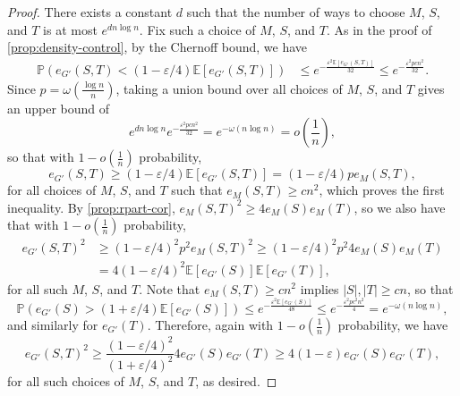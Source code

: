 \documentclass[12pt]{amsart}
\theoremstyle{definition}
\numberwithin{equation}{section}
\newcommand{\EE}{\mathbb{E}}
\begin{document}
\begin{proof}
    There exists a constant $d$ such that the number of ways to choose $M$, $S$, and $T$ is at most $e^{dn\log n}$. Fix such a choice of $M$, $S$, and $T$. 
    As in the proof of \cref{prop:density-control}, by the Chernoff bound, we have 
    \begin{align*}
        \mathbb{P}(e_{G'}(S, T)<(1-\varepsilon/4)\EE[e_{G'}(S, T)]) &\le e^{-\frac{\varepsilon^2\mathbb{E}[e_{G'}(S, T)]}{32}}\le e^{-\frac{\varepsilon^2 p c n^2}{32}}.
    \end{align*}
    Since $p=\omega(\frac{\log n}{n})$, taking a union bound over all choices of $M$, $S$, and $T$ gives an upper bound of
    \[
        e^{dn\log n} e^{-\frac{\varepsilon^2 p c n^2}{32}}=e^{-\omega(n\log n)}=o\left(\frac{1}{n}\right),
    \]
    so that with $1-o(\frac1n)$ probability,
    \[e_{G'}(S, T) \ge (1-\varepsilon/4) \EE[e_{G'}(S, T)]= (1-\varepsilon/4)pe_M(S,T),\]
    for all choices of $M$, $S$, and $T$ such that $e_M(S,T)\ge cn^2$, which proves the first inequality. By \cref{prop:rpart-cor}, $e_M(S, T)^2\ge 4e_M(S)e_M(T)$, so we also have that with $1-o(\frac1n)$ probability,
    \begin{align*}
        e_{G'}(S, T)^2 & \ge (1-\varepsilon/4)^2 p^2e_M(S, T)^2\ge (1-\varepsilon/4)^2 p^2 4e_M(S)e_M(T)\\
        &= 4(1-\varepsilon/4)^2 \mathbb{E}[e_{G'}(S)]\mathbb{E}[e_{G'}(T)],
    \end{align*}
    for all such $M$, $S$, and $T$. Note that $e_M(S,T)\ge cn^2$ implies $|S|,|T|\ge cn$, so that
    \[\mathbb{P}(e_{G'}(S) > (1+\varepsilon/4)\mathbb{E}[e_{G'}(S)]) \le 
    e^{-\frac{\varepsilon^2\mathbb{E}[e_{G'}(S)]}{48}}\le e^{-\frac{\varepsilon^2pc^2 n^2}{4}}=e^{-\omega(n\log n)},\]
    and similarly for $e_{G'}(T)$. 
    Therefore, again with $1-o(\frac1n)$ probability, we have
    \[e_{G'}(S, T)^2\ge \frac{(1-\varepsilon/4)^2}{(1+\varepsilon/4)^2}4e_{G'}(S)e_{G'}(T)\ge 4(1-\varepsilon)e_{G'}(S)e_{G'}(T),\]
    for all such choices of $M$, $S$, and $T$, as desired.
\end{proof}
\end{document}
